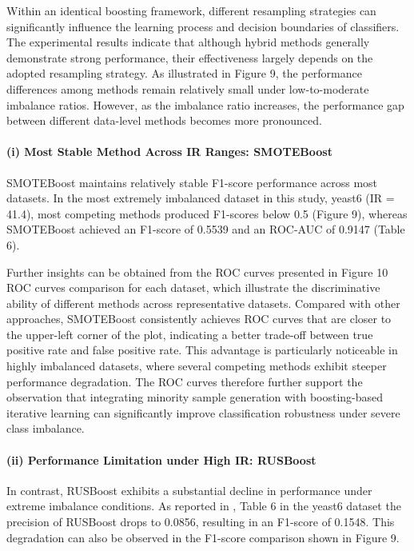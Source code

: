 \documentclass[sigconf]{acmart}
\begin{document}
Within an identical boosting framework, different resampling strategies can significantly influence the learning process and decision boundaries of classifiers. The experimental results indicate that although hybrid methods generally demonstrate strong performance, their effectiveness largely depends on the adopted resampling strategy. As illustrated in Figure 9, the performance differences among methods remain relatively small under low-to-moderate imbalance ratios. However, as the imbalance ratio increases, the performance gap between different data-level methods becomes more pronounced.  

\paragraph{(i) Most Stable Method Across IR Ranges: SMOTEBoost}

SMOTEBoost maintains relatively stable F1-score performance across most datasets. In the most extremely imbalanced dataset in this study, yeast6 (IR = 41.4), most competing methods produced F1-scores below 0.5 (Figure 9), whereas SMOTEBoost achieved an F1-score of 0.5539 and an ROC-AUC of 0.9147 (Table 6). 

Further insights can be obtained from the ROC curves presented in Figure 10 ROC curves comparison for each dataset, which illustrate the discriminative ability of different methods across representative datasets. Compared with other approaches, SMOTEBoost consistently achieves ROC curves that are closer to the upper-left corner of the plot, indicating a better trade-off between true positive rate and false positive rate. This advantage is particularly noticeable in highly imbalanced datasets, where several competing methods exhibit steeper performance degradation. The ROC curves therefore further support the observation that integrating minority sample generation with boosting-based iterative learning can significantly improve classification robustness under severe class imbalance. 

\paragraph{(ii) Performance Limitation under High IR: RUSBoost}

In contrast, RUSBoost exhibits a substantial decline in performance under extreme imbalance conditions. As reported in , Table 6 in the yeast6 dataset the precision of RUSBoost drops to 0.0856, resulting in an F1-score of 0.1548. This degradation can also be observed in the F1-score comparison shown in Figure 9. 
\end{document}
